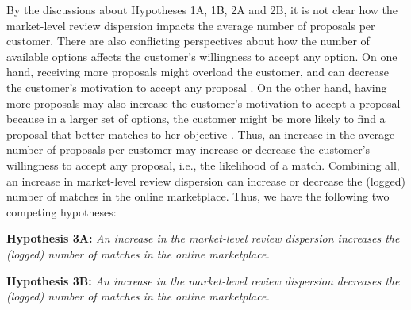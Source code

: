 \documentclass[mnsc,blindrev]{informs3}
\begin{document}
By the discussions about Hypotheses 1A, 1B, 2A and 2B, it is not clear how the market-level review dispersion impacts the average number of proposals per customer. There are also conflicting perspectives about how the number of available options affects the customer's willingness to accept any option. On one hand, receiving more proposals might overload the customer, and can decrease the customer's motivation to accept any proposal \citep{scheibehenne2010can,iyengar2000choice}. On the other hand, having more proposals may also increase the customer's motivation to accept a proposal because in a larger set of options, the customer  might be more likely to find a proposal that better matches to her objective \citep{scheibehenne2010can,baumol1956variety}. Thus, an increase in the average number of proposals per customer may increase or decrease the customer's willingness to accept any proposal, i.e., the likelihood of a match. Combining all, an increase in market-level review dispersion can increase or decrease the (logged) number of matches in the online marketplace. Thus, we have the following two competing hypotheses:

	
	
	\noindent\textbf{Hypothesis 3A:} \emph{An increase in the market-level review dispersion increases the (logged) number of matches in the online marketplace.}
	
	\noindent\textbf{Hypothesis 3B:} \emph{An increase in the market-level review dispersion decreases the (logged) number of matches in the online marketplace.}
	
	
	
	
\end{document}
